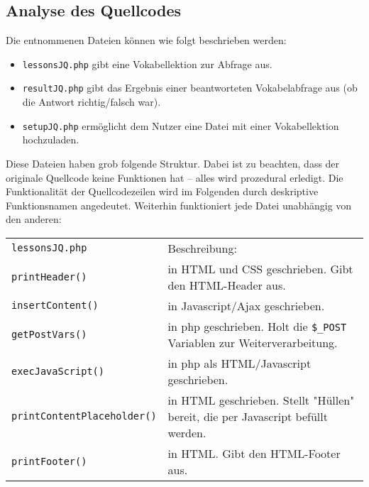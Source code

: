 \documentclass{scrartcl}
\begin{document}
\subsection{Analyse des Quellcodes}
\label{analquell}
Die entnommenen Dateien können wie folgt beschrieben werden:
\begin{itemize}
\item \lstinline`lessonsJQ.php` gibt eine Vokabellektion zur Abfrage aus.
\item \lstinline`resultJQ.php` gibt das Ergebnis einer beantworteten Vokabelabfrage aus (ob die Antwort richtig/falsch war).
\item \lstinline`setupJQ.php` ermöglicht dem Nutzer eine Datei mit einer Vokabellektion hochzuladen.
\end{itemize}
Diese Dateien haben grob folgende Struktur. Dabei ist zu beachten, dass der originale Quellcode keine Funktionen hat -- alles wird prozedural erledigt. Die Funktionalität der Quellcodezeilen wird im Folgenden durch deskriptive Funktionsnamen angedeutet. Weiterhin funktioniert jede Datei unabhängig von den anderen:
\begin{center}
\begin{tabular}{|p{}|>{\footnotesize} p{}}
\lstinline`lessonsJQ.php` & Beschreibung:\\
\lstinline`printHeader()` & in HTML und CSS geschrieben. Gibt den HTML-Header aus.\\
\lstinline`insertContent()` & in Javascript/Ajax geschrieben. \\
\lstinline`getPostVars()` & in php geschrieben. Holt die \lstinline`$_POST` Variablen zur Weiterverarbeitung.\\
\lstinline`execJavaScript()` & in php als HTML/Javascript geschrieben. \\
\lstinline`printContentPlaceholder()` & in HTML geschrieben. Stellt "Hüllen" bereit, die per Javascript befüllt werden.\\
\lstinline`printFooter()` & in HTML. Gibt den HTML-Footer aus.\\
\end{tabular}
\end{center}
\end{document}
